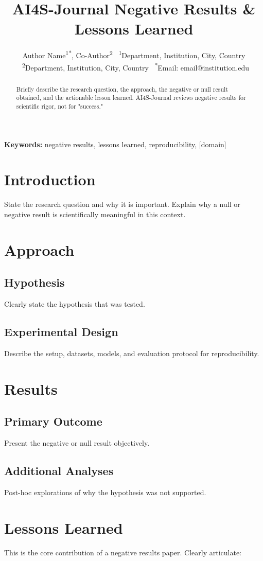 \documentclass[12pt,a4paper]{article}
\title{\textbf{\textcolor{ai4sgold}{AI4S-Journal} Negative Results \& Lessons Learned}}
\author{Author Name\textsuperscript{1*}, Co-Author\textsuperscript{2} \
\textsuperscript{1}Department, Institution, City, Country \
\textsuperscript{2}Department, Institution, City, Country \
\textsuperscript{*}Email: email@institution.edu}
\date{}
\begin{document}
\maketitle

\begin{abstract}
Briefly describe the research question, the approach, the negative or null
result obtained, and the actionable lesson learned. AI4S-Journal reviews
negative results for scientific rigor, not for "success."
\end{abstract}
\noindent\textbf{Keywords:} negative results, lessons learned, reproducibility, [domain]

\section{Introduction}
State the research question and why it is important. Explain why a null or
negative result is scientifically meaningful in this context.

\section{Approach}
\subsection{Hypothesis}
Clearly state the hypothesis that was tested.
\subsection{Experimental Design}
Describe the setup, datasets, models, and evaluation protocol for reproducibility.

\section{Results}
\subsection{Primary Outcome}
Present the negative or null result objectively.
\subsection{Additional Analyses}
Post-hoc explorations of why the hypothesis was not supported.

\section{Lessons Learned}
This is the core contribution of a negative results paper. Clearly articulate:
\end{document}
